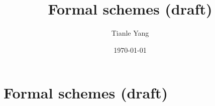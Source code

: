 \documentclass{noteformyself}
\title{Formal schemes (draft)}
\author{Tianle Yang}
\date{\today}
\begin{document}
    \maketitle

    \section{Formal schemes (draft)}



\end{document}
